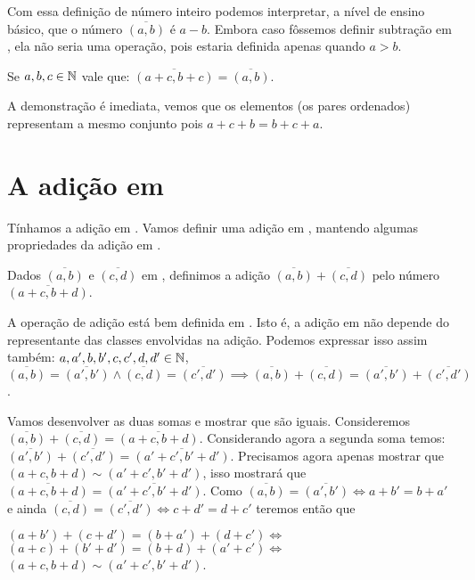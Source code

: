 \documentclass[../main.tex]{subfiles}
\begin{document}
Com essa definição de número inteiro podemos interpretar, a nível de ensino básico, que o número $\overline{(a,b)}$ é $a - b$. Embora caso fôssemos definir subtração em \N, ela não seria uma operação, pois estaria definida apenas quando $a > b$.

\begin{prop}
    Se $a,b,c \in \mathbb{N}$ vale que: $\overline{(a+c,b+c)} = \overline{(a,b)}$.
\end{prop}
\begin{dem}
    A demonstração é imediata, vemos que os elementos (os pares ordenados) representam a mesmo conjunto pois $a+c+b = b+c+a$.
\end{dem}

\section{A adição em \Z}
Tínhamos a adição em \N. Vamos definir uma adição em \Z, mantendo algumas propriedades da adição em \N.
\begin{defi}
    Dados $\overline{(a,b)}$ e $\overline{(c,d)}$ em \Z, definimos a adição $\overline{(a,b)} + \overline{(c,d)}$ pelo número $\overline{(a+c, b+d)}$.
\end{defi}
\begin{prop}
    A operação de adição está bem definida em \Z. Isto é, a adição em \Z não depende do representante das classes envolvidas na adição. Podemos expressar isso assim também: $a,a',b,b',c,c',d,d' \in \mathbb{N}$, $\overline{(a,b)} = \overline{(a',b')} \land \overline{(c,d)} = \overline{(c',d')}
    \implies \overline{(a,b)} + \overline{(c,d)} = \overline{(a',b')} + \overline{(c',d')} $.
\end{prop}
\begin{dem}
    Vamos desenvolver as duas somas e mostrar que são iguais. Consideremos 
    $\overline{(a,b)} + \overline{(c,d)} = \overline{(a+c,b+d)}$.
    Considerando agora a segunda soma temos: 
    $\overline{(a',b')} + \overline{(c',d')} = \overline{(a'+c',b'+d')}$.
    Precisamos agora apenas mostrar que $(a+c,b+d) \sim (a'+c',b'+d')$, isso mostrará que 
    $\overline{(a+c,b+d)} = \overline{(a'+c',b'+d')}$. 
    Como $\overline{(a,b)} = \overline{(a',b')} \iff a+b' = b+a'$ e ainda
     $\overline{(c,d)} = \overline{(c',d')} \iff c+d' = d+c'$ teremos então que 
     \begin{center}
         $(a+b')+(c+d') = (b+a')+(d+c') \iff $ \\
         $(a+c) + (b'+d') = (b+d) + (a'+c') \iff $ \\
         $(a+c,b+d) \sim (a'+c',b'+d')$.
     \end{center}
\end{dem}
\end{document}
